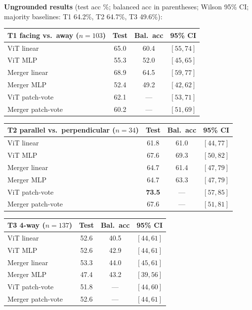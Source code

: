 \textbf{Ungrounded results} (test acc \%; balanced acc in parentheses; Wilson
95\% CI; majority baselines: T1 64.2\%, T2 64.7\%, T3 49.6\%):
\begin{center}
\footnotesize
\begin{tabular}{lccc}
\toprule
T1 facing vs.\ away ($n{=}103$) & Test & Bal.\ acc & 95\% CI \\
\midrule
ViT linear & 65.0 & 60.4 & $[55, 74]$ \\
ViT MLP & 55.3 & 52.0 & $[45, 65]$ \\
Merger linear & 68.9 & 64.5 & $[59, 77]$ \\
Merger MLP & 52.4 & 49.2 & $[42, 62]$ \\
ViT patch-vote & 62.1 & --- & $[53, 71]$ \\
Merger patch-vote & 60.2 & --- & $[51, 69]$ \\
\bottomrule
\end{tabular}
\end{center}
\begin{center}
\footnotesize
\begin{tabular}{lccc}
\toprule
T2 parallel vs.\ perpendicular ($n{=}34$) & Test & Bal.\ acc & 95\% CI \\
\midrule
ViT linear & 61.8 & 61.0 & $[44, 77]$ \\
ViT MLP & 67.6 & 69.3 & $[50, 82]$ \\
Merger linear & 64.7 & 61.4 & $[47, 79]$ \\
Merger MLP & 64.7 & 63.3 & $[47, 79]$ \\
ViT patch-vote & \textbf{73.5} & --- & $[57, 85]$ \\
Merger patch-vote & 67.6 & --- & $[51, 81]$ \\
\bottomrule
\end{tabular}
\end{center}
\begin{center}
\footnotesize
\begin{tabular}{lccc}
\toprule
T3 4-way ($n{=}137$) & Test & Bal.\ acc & 95\% CI \\
\midrule
ViT linear & 52.6 & 40.5 & $[44, 61]$ \\
ViT MLP & 52.6 & 42.9 & $[44, 61]$ \\
Merger linear & 53.3 & 44.0 & $[45, 61]$ \\
Merger MLP & 47.4 & 43.2 & $[39, 56]$ \\
ViT patch-vote & 51.8 & --- & $[44, 60]$ \\
Merger patch-vote & 52.6 & --- & $[44, 61]$ \\
\bottomrule
\end{tabular}
\end{center}


